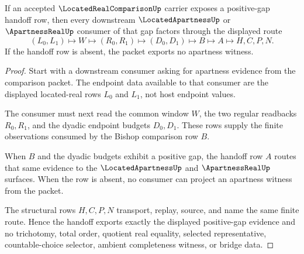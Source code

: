\begin{theorem}
\label{thm:located-real-comparison-apartness-handoff}
If an accepted $\LocatedRealComparisonUp$ carrier exposes a positive-gap handoff row, then every downstream $\LocatedApartnessUp$ or $\ApartnessRealUp$ consumer of that gap factors through the displayed route
$$
(L_0,L_1)\longmapsto W\longmapsto(R_0,R_1)\longmapsto(D_0,D_1)\longmapsto B\longmapsto A\longmapsto H,C,P,N.
$$
If the handoff row is absent, the packet exports no apartness witness.
\end{theorem}
\begin{proof}
Start with a downstream consumer asking for apartness evidence from the comparison packet. The endpoint data available to that consumer are the displayed located-real rows $L_0$ and $L_1$, not host endpoint values.

The consumer must next read the common window $W$, the two regular readbacks $R_0,R_1$, and the dyadic endpoint budgets $D_0,D_1$. These rows supply the finite observations consumed by the Bishop comparison row $B$.

When $B$ and the dyadic budgets exhibit a positive gap, the handoff row $A$ routes that same evidence to the $\LocatedApartnessUp$ and $\ApartnessRealUp$ surfaces. When the row is absent, no consumer can project an apartness witness from the packet.

The structural rows $H,C,P,N$ transport, replay, source, and name the same finite route. Hence the handoff exports exactly the displayed positive-gap evidence and no trichotomy, total order, quotient real equality, selected representative, countable-choice selector, ambient completeness witness, or bridge data.
\end{proof}

